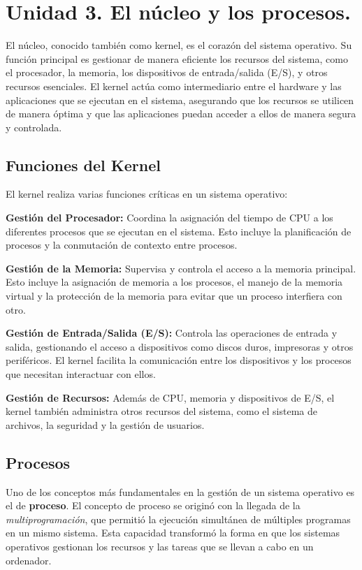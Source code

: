 \chapter{Unidad 3. El núcleo y los procesos.}
El núcleo, conocido también como kernel, es el corazón del sistema operativo. Su función principal es gestionar de manera eficiente los recursos del sistema, como el procesador, la memoria, los dispositivos de entrada/salida (E/S), y otros recursos esenciales. El kernel actúa como intermediario entre el hardware y las aplicaciones que se ejecutan en el sistema, asegurando que los recursos se utilicen de manera óptima y que las aplicaciones puedan acceder a ellos de manera segura y controlada.

\begin{tcolorbox}
	\section{
		Funciones del Kernel}
	
	El kernel realiza varias funciones críticas en un sistema operativo:
	
	\textbf{Gestión del Procesador: }Coordina la asignación del tiempo de CPU a los diferentes procesos que se ejecutan en el sistema. Esto incluye la planificación de procesos y la conmutación de contexto entre procesos.
	
	\textbf{Gestión de la Memoria:} Supervisa y controla el acceso a la memoria principal. Esto incluye la asignación de memoria a los procesos, el manejo de la memoria virtual y la protección de la memoria para evitar que un proceso interfiera con otro.
	
	\textbf{
		Gestión de Entrada/Salida (E/S):} Controla las operaciones de entrada y salida, gestionando el acceso a dispositivos como discos duros, impresoras y otros periféricos. El kernel facilita la comunicación entre los dispositivos y los procesos que necesitan interactuar con ellos.
	
	\textbf{Gestión de Recursos: }Además de CPU, memoria y dispositivos de E/S, el kernel también administra otros recursos del sistema, como el sistema de archivos, la seguridad y la gestión de usuarios.


\end{tcolorbox}
\section{Procesos}

Uno de los conceptos más fundamentales en la gestión de un sistema operativo es el de \textbf{proceso}. El concepto de proceso se originó con la llegada de la \textit{multiprogramación}, que permitió la ejecución simultánea de múltiples programas en un mismo sistema. Esta capacidad transformó la forma en que los sistemas operativos gestionan los recursos y las tareas que se llevan a cabo en un ordenador.

